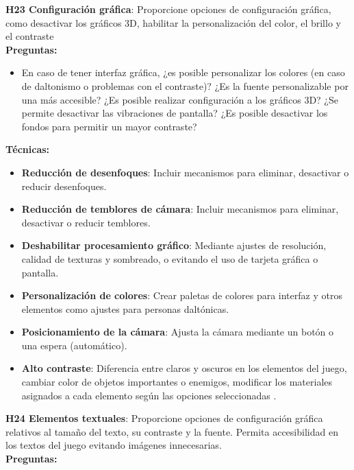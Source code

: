 \textbf{H23 Configuración gráfica}: Proporcione opciones de configuración gráfica, como desactivar los gráficos 3D, habilitar la personalización del color, el brillo y el contraste \cite{araujoMobileAudioGames2017a} \cite{WebContentAccessibility} \cite{teixeiraborgesFairPlayGuidelines2018a} \\
\textbf{Preguntas:}
\begin{itemize}
	\item En caso de tener interfaz gráfica, ¿es posible personalizar los colores (en caso de daltonismo o problemas con el contraste)? ¿Es la fuente personalizable por una más accesible? ¿Es posible realizar configuración a los gráficos 3D? ¿Se permite desactivar las vibraciones de pantalla? ¿Es posible desactivar los fondos para permitir un mayor contraste?
\end{itemize}
\textbf{Técnicas:}
\begin{itemize}
	\item \textbf{Reducción de desenfoques}: Incluir mecanismos para eliminar, desactivar o reducir desenfoques. \cite{LibroBlancoAccesibilidad} 
	\item \textbf{Reducción de temblores de cámara}: Incluir mecanismos para eliminar, desactivar o reducir temblores.\cite{LibroBlancoAccesibilidad} 
	\item \textbf{Deshabilitar procesamiento gráfico}: Mediante ajustes de resolución, calidad de texturas y sombreado, o evitando el uso de tarjeta gráfica o pantalla. \cite{LibroBlancoAccesibilidad} 
	\item \textbf{Personalización de colores}: Crear paletas de colores para interfaz y otros elementos como ajustes para personas daltónicas. \cite{LibroBlancoAccesibilidad} 
	\item \textbf{Posicionamiento de la cámara}: Ajusta la cámara mediante un botón o una espera (automático). \cite{LibroBlancoAccesibilidad} 
	\item \textbf{Alto contraste}: Diferencia entre claros y oscuros en los elementos del juego, cambiar color de objetos importantes o enemigos, modificar los materiales asignados a cada elemento según las opciones seleccionadas \cite{LibroBlancoAccesibilidad}. 
\end{itemize}
\textbf{H24 Elementos textuales}: Proporcione opciones de configuración gráfica relativos al tamaño del texto, su contraste y la fuente. Permita accesibilidad en los textos del juego evitando imágenes innecesarias. \cite{WebContentAccessibility} \\
\textbf{Preguntas:}
